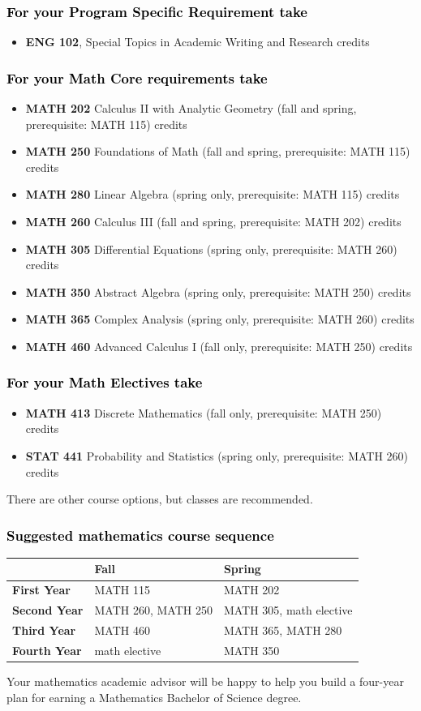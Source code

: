 \documentclass[10pt]{article}
\newenvironment{mypar}[2]
   {\begin{list}{}%
     {\setlength\leftmargin{#1}
     \setlength\rightmargin{#2}}
     \item[]}
   {\end{list}}
\newcommand{\calconeshort}{MATH 115}
\newcommand{\calctwo}{\textbf{MATH 202} Calculus II with Analytic Geometry (fall and spring, prerequisite: MATH 115) \dotfill 5 credits }
\newcommand{\calctwoshort}{MATH 202}
\newcommand{\foundations}{\textbf{MATH 250} Foundations of Math (fall and spring, prerequisite: MATH 115)  \dotfill 3 credits}
\newcommand{\foundationsshort}{MATH 250}
\newcommand{\calcthree}{\textbf{MATH 260} Calculus III  (fall and spring, prerequisite: MATH 202) \dotfill 5 credits}
\newcommand{\calcthreeshort}{MATH 260}
\newcommand{\linear}{\textbf{MATH 280} Linear Algebra (spring only, prerequisite: MATH 115) \dotfill 3 credits}
\newcommand{\linearshort}{MATH 280}
\newcommand{\discrete}{\textbf{MATH 413} Discrete Mathematics  (fall only, prerequisite: MATH 250)\dotfill 3 credits}
\newcommand{\statistics}{\textbf{STAT 441} Probability and Statistics (spring only, prerequisite: MATH 260)  \dotfill  3 credits}
\newcommand{\diffeq}{\textbf{MATH 305}	Differential Equations (spring only, prerequisite: MATH 260) \dotfill 	3 credits}
\newcommand{\diffeqshort}{MATH 305}
\newcommand{\abstractalgebra}{\textbf{MATH 350}	Abstract Algebra (spring only, prerequisite: MATH 250) \dotfill 	3 credits}
\newcommand{\abstractalgebrashort}{MATH 350}
\newcommand{\complex}{\textbf{MATH 365}	Complex Analysis (spring only,  prerequisite: MATH 260) \dotfill 3 credits}
\newcommand{\complexshort}{MATH 365}
\newcommand{\advancedcalc}{\textbf{MATH 460}	Advanced Calculus I  (fall only,   prerequisite: MATH 250) \dotfill 3 credits}
\newcommand{\advancedcalcshort}{MATH 460}
\newcommand{\mathBS}{
     \begin{center}
         \begin{tabular}[h]{| l | l | l|} 
            \hline
                       & \textbf{Fall}         &  \textbf{Spring}  \\ \hline 
            \textbf{First Year} & \calconeshort{}  & \calctwoshort \\  \hline
            \textbf{Second Year} &  \calcthreeshort{}, \foundationsshort & \diffeqshort, math elective \\ \hline
            \textbf{Third Year} & \advancedcalcshort              &  \complexshort{}, \linearshort \\ \hline
            \textbf{Fourth Year} & math elective &  \abstractalgebrashort  \\ \hline
         \end{tabular}
\end{center}}
\begin{document}
\subsubsection*{\textcolor{black}{For your Program Specific Requirement take}}

\begin{itemize}
   \item \textbf{ENG 102}, Special Topics in Academic Writing and Research  credits
\end{itemize}

	

\subsubsection*{\textcolor{black}{For your Math Core requirements take}}

\begin{itemize}
   \item \calctwo
   \item \foundations
   \item \linear
   \item \calcthree
   \item \diffeq
  \item \abstractalgebra
  \item \complex
  \item \advancedcalc
\end{itemize}



\subsubsection*{\textcolor{black}{For your  Math Electives take}}
\begin{itemize}
\item \discrete
\item \statistics
\end{itemize}
\begin{mypar}{0.5cm}{0.5cm}  There are other course options, but classes
   are recommended. \end{mypar}

\subsubsection*{\textcolor{black}{Suggested mathematics course sequence}}
   \mathBS
\begin{mypar}{0.5cm}{0.5cm}  Your mathematics academic advisor will be happy to help you build a four-year plan for earning a Mathematics Bachelor of Science degree. \end{mypar}
\newpage
\end{document}
